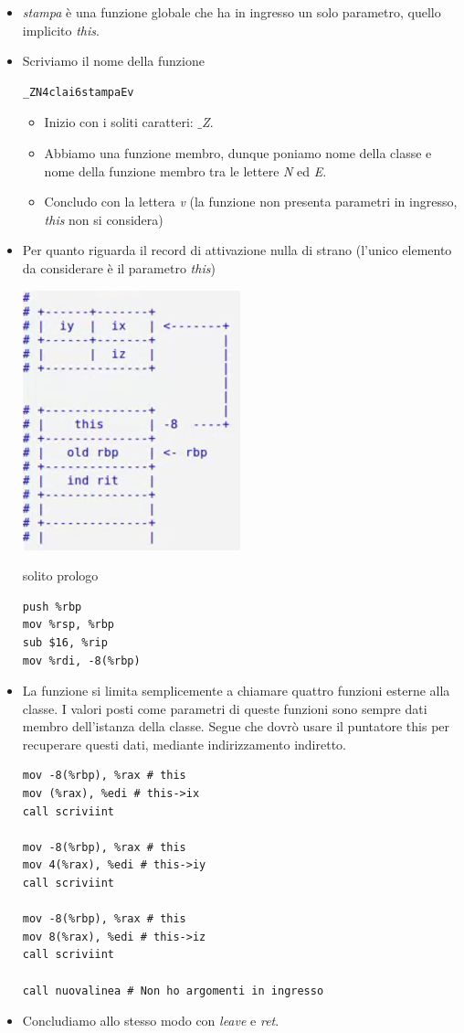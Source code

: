 \documentclass[11pt]{report}
\theoremstyle{definition}
\begin{document}
\begin{itemize}
\item \emph{stampa} è una funzione globale che ha in ingresso un solo parametro, quello implicito \emph{this}.
\item Scriviamo il nome della funzione
\begin{verbatim}
_ZN4clai6stampaEv
\end{verbatim}
\begin{itemize}
	\item Inizio con i soliti caratteri: \emph{$\_$Z}.
	\item Abbiamo una funzione membro, dunque poniamo nome della classe e nome della funzione membro tra le lettere \emph{N} ed \emph{E}.
	\item Concludo con la lettera \emph{v} (la funzione non presenta parametri in ingresso, \emph{this} non si considera)
\end{itemize}
\item Per quanto riguarda il record di attivazione nulla di strano (l'unico elemento da considerare è il parametro \emph{this})
\begin{center}
\includegraphics{img/39.PNG}
\end{center}  
solito prologo
\begin{verbatim}
push %rbp
mov %rsp, %rbp
sub $16, %rip
mov %rdi, -8(%rbp)
\end{verbatim}
\item La funzione si limita semplicemente a chiamare quattro funzioni esterne alla classe. I valori posti come parametri di queste funzioni sono sempre dati membro dell'istanza della classe. Segue che dovrò usare il puntatore this per recuperare questi dati, mediante indirizzamento indiretto. 
\begin{verbatim}
mov -8(%rbp), %rax # this
mov (%rax), %edi # this->ix
call scriviint
     
mov -8(%rbp), %rax # this
mov 4(%rax), %edi # this->iy
call scriviint
     
mov -8(%rbp), %rax # this
mov 8(%rax), %edi # this->iz
call scriviint
     
call nuovalinea # Non ho argomenti in ingresso
\end{verbatim}
\item Concludiamo allo stesso modo con \emph{leave} e \emph{ret}.
\end{itemize}
\end{document}
